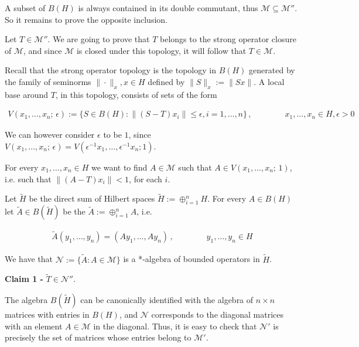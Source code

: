 \documentclass[12pt]{article}
\begin{document}
A subset of $B(H)$ is always contained in its double commutant, thus $\mathcal{M} \subseteq \mathcal{M}''$. So it remains to prove the opposite inclusion.

Let $T \in \mathcal{M}''$. We are going to prove that $T$ belongs to the strong operator closure of $\mathcal{M}$, and since $\mathcal{M}$ is closed under this topology, it will follow that $T \in \mathcal{M}$.

Recall that the strong operator topology is the topology in $B(H)$ generated by the family of seminorms $\| \cdot \|_x, x \in H$ defined by $\|S\|_x:=\|Sx\|$. A local base around $T$, in this topology, consists of sets of the form

\begin{align*}
V(x_1, \dots, x_n;\, \epsilon):= \{S \in B(H) : \|(S - T)x_i\| \leq \epsilon, i=1, \dots, n\}\,, \qquad\qquad x_1, \dots, x_n \in H, \epsilon >0
\end{align*}

We can however consider $\epsilon$ to be $1$, since $V(x_1, \dots, x_n;\, \epsilon)= V(\epsilon^{-1}x_1, \dots, \epsilon^{-1} x_n; 1)$.

For every $x_1, \dots, x_n \in H$ we want to find $A \in \mathcal{M}$ such that $A \in V(x_1, \dots, x_n;\, 1)$, i.e. such that $\|(A - T)x_i\| < 1$, for each $i$.

Let $\widetilde{H}$ be the direct sum of Hilbert spaces $\widetilde{H}:= \oplus_{i = 1}^n H$. For every $A \in B(H)$ let $\widetilde{A} \in B(\widetilde{H})$ be the  $\widetilde{A}:= \oplus_{i=1}^n A$, i.e.

\begin{align*}
\widetilde{A} (y_1, \dots, y_n) = (Ay_1, \dots, Ay_n)\,, \qquad\qquad y_1, \dots, y_n \in H
\end{align*}

We have that $\mathcal{N}:= \{\widetilde{A}: A \in \mathcal{M}\}$ is a *-algebra of bounded operators in $\widetilde{H}$.

{\bf Claim 1 -} $\widetilde{T} \in \mathcal{N}''$.

The algebra $B(\widetilde{H})$ can be canonically identified with the algebra of $n \times n$ matrices with entries in $B(H)$, and $\mathcal{N}$ corresponds to the diagonal matrices with an element $A \in \mathcal{M}$ in the diagonal. Thus, it is easy to check that $\mathcal{N}'$ is precisely the set of matrices whose entries belong to $\mathcal{M}'$. 
\end{document}
